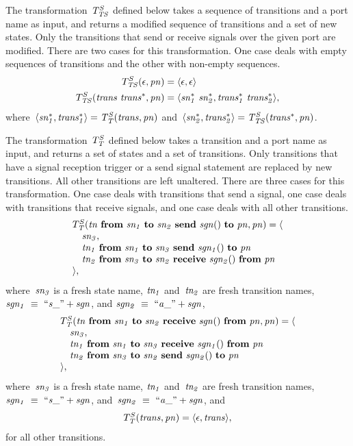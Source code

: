 The transformation~$T^S_{\it{TS}}$ defined below takes a sequence of transitions and a port name as input, and returns a modified sequence of transitions and a set of new states.
Only the transitions that send or receive signals over the given port are modified.
There are two cases for this transformation.
One case deals with empty sequences of transitions and the other with non-empty sequences.
%
\begin{align*}
T^S_{\it{TS}}(\epsilon, \it{pn}) & = \langle \epsilon, \epsilon \rangle \\
T^S_{\it{TS}}(\it{trans}~\it{trans^*}, \it{pn}) & = \langle \it{sn^*_1}~\it{sn^*_2}, \it{trans^*_1}~\it{trans^*_2} \rangle,
\end{align*}
where~$\langle \it{sn^*_1}, \it{trans^*_1} \rangle = T^S_{\it{T}}(\it{trans}, \it{pn})$ and~$\langle \it{sn^*_2}, \it{trans^*_2} \rangle = T^S_{\it{TS}}(\it{trans^*}, \it{pn})$.

The transformation~$T^S_{\it{T}}$ defined below takes a transition and a port name as input, and returns a set of states and a set of transitions.
Only transitions that have a signal reception trigger or a send signal statement are replaced by new transitions.
All other transitions are left unaltered.
There are three cases for this transformation.
One case deals with transitions that send a signal, one case deals with transitions that receive signals, and one case deals with all other transitions.
%
\[
\begin{array}{l}
T^S_{\it{T}}(\it{tn}~\textbf{from}~\it{sn_1}~\textbf{to}~\it{sn_2}~\textbf{send}~\it{sgn}()~\textbf{to}~\it{pn}, \it{pn}) =
\langle \\
\quad \it{sn_3}, \\
\quad \it{tn_1}~\textbf{from}~\it{sn_1}~\textbf{to}~\it{sn_3}~\textbf{send}~\it{sgn_1}()~\textbf{to}~\it{pn} \\
\quad \it{tn_2}~\textbf{from}~\it{sn_3}~\textbf{to}~\it{sn_2}~\textbf{receive}~\it{sgn_2}()~\textbf{from}~\it{pn} \\
\rangle,
\end{array}
\]
where~$\it{sn_3}$ is a fresh state name, $\it{tn_1}$ and~$\it{tn_2}$ are fresh transition names, $\it{sgn_1}~\equiv~``s\_"+\it{sgn}$, and $\it{sgn_2}~\equiv~``a\_"+\it{sgn}$,
\[
\begin{array}{l}
T^S_{\it{T}}(\it{tn}~\textbf{from}~\it{sn_1}~\textbf{to}~\it{sn_2}~\textbf{receive}~\it{sgn}()~\textbf{from}~\it{pn}, \it{pn}) =
\langle \\
\quad \it{sn_3}, \\
\quad \it{tn_1}~\textbf{from}~\it{sn_1}~\textbf{to}~\it{sn_3}~\textbf{receive}~\it{sgn_1}()~\textbf{from}~\it{pn} \\
\quad \it{tn_2}~\textbf{from}~\it{sn_3}~\textbf{to}~\it{sn_2}~\textbf{send}~\it{sgn_2}()~\textbf{to}~\it{pn} \\
\rangle,
\end{array}
\]
where~$\it{sn_3}$ is a fresh state name, $\it{tn_1}$ and~$\it{tn_2}$ are fresh transition names, $\it{sgn_1}~\equiv~``s\_"+\it{sgn}$, and~$\it{sgn_2}~\equiv~``a\_"+\it{sgn}$, and
\[
\begin{array}{l}
T^S_{\it{T}}(\it{trans}, \it{pn}) = \langle \epsilon, \it{trans} \rangle,
\end{array}
\]
for all other transitions. 